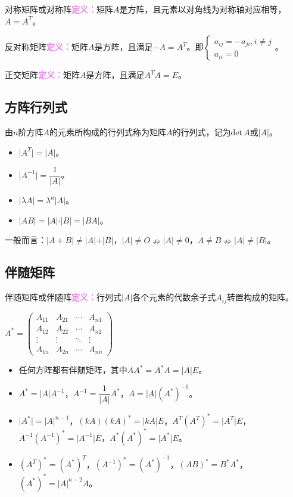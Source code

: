 \documentclass[UTF8, 12pt]{ctexart}
\begin{document}
对称矩阵或对称阵\textcolor{violet}{\textbf{定义：}}矩阵$A$是方阵，且元素以对角线为对称轴对应相等，$A=A^T$。

反对称矩阵\textcolor{violet}{\textbf{定义：}}矩阵$A$是方阵，且满足$-A=A^T$。即$\left\{\begin{array}{l}
    a_{ij}=-a_{ji},i\neq j \\
    a_{ii}=0
\end{array}\right.$。

正交矩阵\textcolor{violet}{\textbf{定义：}}矩阵$A$是方阵，且满足$A^TA=E$。

\subsection{方阵行列式}

由$n$阶方阵$A$的元素所构成的行列式称为矩阵$A$的行列式，记为$\textrm{det}\,A$或$\vert A\vert$。

\begin{itemize}
    \item $\vert A^T\vert=\vert A\vert$。
    \item $\vert A^{-1}\vert=\dfrac{1}{\vert A\vert}$。
    \item $\vert\lambda A\vert=\lambda^n\vert A\vert$。
    \item $\vert AB\vert=\vert A\vert\cdot\vert B\vert=\vert BA\vert$。
\end{itemize}

一般而言：$\vert A+B\vert\neq\vert A\vert+\vert B\vert$，$\vert A\vert\neq O\nRightarrow\vert A\vert\neq0$，$A\neq B\nRightarrow\vert A\vert\neq\vert B\vert$。

\subsection{伴随矩阵}

伴随矩阵或伴随阵\textcolor{violet}{\textbf{定义：}}行列式$\vert A\vert$各个元素的代数余子式$A_{ij}$转置构成的矩阵。

$A^*=\left(
    \begin{array}{cccc}
        A_{11} & A_{21} & \cdots & A_{n1} \\
        A_{12} & A_{22} & \cdots & A_{n2} \\
        \vdots & \vdots & \ddots & \vdots \\
        A_{1n} & A_{2n} & \cdots & A_{nn}
    \end{array}
\right)$

\begin{itemize}
    \item 任何方阵都有伴随矩阵，其中$AA^*=A^*A=\vert A\vert E$。
    \item $A^*=\vert A\vert A^{-1}$，$A^{-1}=\dfrac{1}{\vert A\vert}A^*$，$A=\vert A\vert(A^*)^{-1}$。
    \item $\vert A^*\vert=\vert A\vert^{n-1}$，$(kA)(kA)^*=\vert kA\vert E$，$A^T(A^T)^*=\vert A^T\vert E$，$A^{-1}(A^{-1})^*=\vert A^{-1}\vert E$，$A^*(A^*)^*=\vert A^*\vert E$。
    \item $(A^T)^*=(A^*)^T$，$(A^{-1})^*=(A^*)^{-1}$，$(AB)^*=B^*A^*$，$(A^*)^*=\vert A\vert^{n-2}A$。
\end{itemize}
\end{document}
